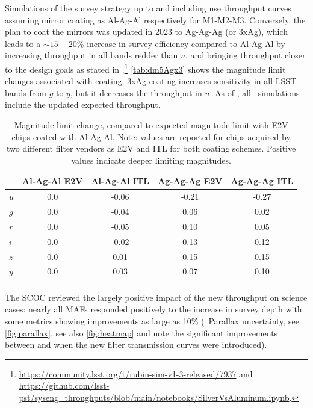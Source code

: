 Simulations of the survey strategy up to and including  use throughput curves assuming mirror coating as Al-Ag-Al respectively for M1-M2-M3. Conversely, the plan to coat the mirrors was updated in 2023 to Ag-Ag-Ag (or 3xAg), which leads to a $\sim15-20\%$ increase in survey efficiency compared to Al-Ag-Al by increasing throughput in all bands redder than $u$, and bringing throughput closer to the design goals as stated in .\footnote{\url{https://community.lsst.org/t/rubin-sim-v1-3-released/7937} and \url{https://github.com/lsst-pst/syseng_throughputs/blob/main/notebooks/SilverVsAluminum.ipynb}.}  \autoref{tab:dm5Agx3} shows the magnitude limit changes associated with coating.  3xAg coating increases sensitivity in all LSST bands from $g$ to $y$, but it decreases the throughput in $u$.  As of , all \opsim\ simulations include the updated expected throughput.

\begin{longtable}{lcccc}
 \\\hline
& Al-Ag-Al E2V &	Al-Ag-Al ITL &		Ag-Ag-Ag E2V &		Ag-Ag-Ag ITL\\
\hline
$u$	 &	0.0	 &	-0.06 &		-0.21 &		-0.27\\
$g$	 &	0.0	 &	-0.04 &		0.06 &		0.02\\
$r$	 &	0.0	 &	-0.05 &	    0.10 &	 0.05\\
$i$	 &	0.0	 &	-0.02 &		0.13 &		0.12\\
$z$	 &	0.0	 &	0.01  &		0.15  &		0.15\\
$y$	 &	0.0	 &	0.03  &		0.07  &		0.10\\
\caption{Magnitude limit change, compared to expected magnitude limit with E2V chips coated with Al-Ag-Al. Note: values are reported for chips acquired by two different filter vendors as E2V and ITL for both coating schemes. Positive values indicate deeper limiting magnitudes.
}\label{tab:dm5Agx3}
\end{longtable}
The SCOC reviewed the largely positive impact of the new throughput on science cases: nearly all MAFs responded positively to the increase in survey depth with some metrics showing improvements as large as 10\% (\eg\ Parallax uncertainty, see \autoref{fig:parallax}, see also \autoref{fig:heatmap} and note the significant improvements between  and  when the new filter transmission curves were introduced). 

